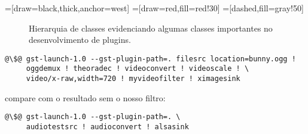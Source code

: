 =[draw=black,thick,anchor=west]
=[draw=red,fill=red!30]
=[dashed,fill=gray!50]
\begin{figure}[H]
  \centering
  \label{fig:plugins_class_hierarch}
  \caption{Hierarquia de classes evidenciando algumas classes importantes no
           desenvolvimento de plugins.}
\end{figure}





\begin{lstlisting}[style=command]
@\$@ gst-launch-1.0 --gst-plugin-path=. filesrc location=bunny.ogg ! 
     oggdemux ! theoradec ! videoconvert ! videoscale ! \
     video/x-raw,width=720 ! myvideofilter ! ximagesink
\end{lstlisting}

\noindent compare com o resultado sem o nosso filtro:
\begin{lstlisting}[style=command]
@\$@ gst-launch-1.0 --gst-plugin-path=. \
     audiotestsrc ! audioconvert ! alsasink
\end{lstlisting}

